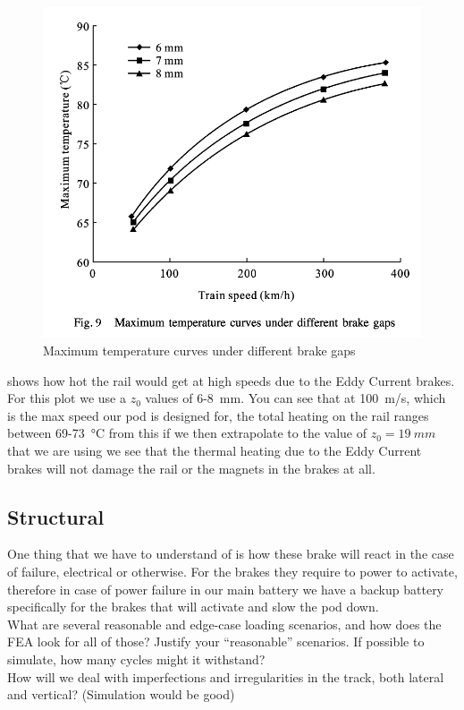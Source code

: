 \documentclass[main.tex]{subfiles}
\begin{document}
    \begin{figure}
    	\centering
        \includegraphics[width=\linewidth]{images/EC_heat}
        \caption{Maximum temperature curves under different brake gaps}
        \label{fig:ec-heat}
    \end{figure}
     shows how hot the rail would get at high speeds due to the Eddy Current brakes. For this plot we use a $z_0$ values of 6-\SI{8}{mm}. You can see that at \SI{100}{m/s}, which is the max speed our pod is designed for, the total heating on the rail ranges between 69-\SI{73}{\celsius} from this if we then extrapolate to the value of $z_0 = \SI{19}{mm}$ that we are using we see that the thermal heating due to the Eddy Current brakes will not damage the rail or the magnets in the brakes at all.

    \subsection{Structural}
    One thing that we have to understand of is how these brake will react in the case of failure, electrical or otherwise. For the brakes they require to power to activate, therefore in case of power failure in our main battery we have a backup battery specifically for the brakes that will activate and slow the pod down.  \\
    What are several reasonable and edge-case loading scenarios, and how does the FEA look for all of those? Justify your “reasonable” scenarios. If possible to simulate, how many cycles might it withstand?\\
    How will we deal with imperfections and irregularities in the track, both lateral and vertical? (Simulation would be good)
\end{document}
